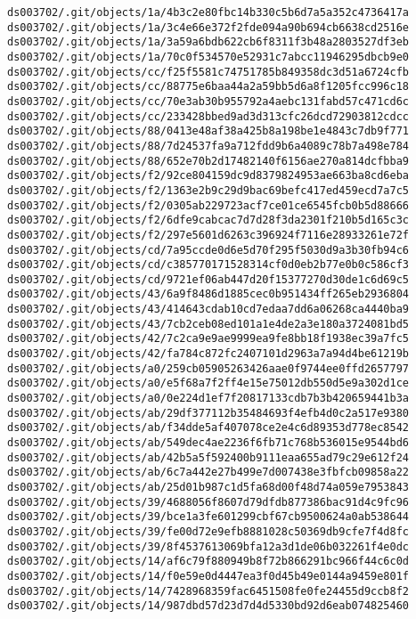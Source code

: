 \documentclass[11pt]{article}
\begin{document}
\begin{Verbatim}[commandchars=\\\{\}]
ds003702/.git/objects/1a/4b3c2e80fbc14b330c5b6d7a5a352c4736417a
ds003702/.git/objects/1a/3c4e66e372f2fde094a90b694cb6638cd2516e
ds003702/.git/objects/1a/3a59a6bdb622cb6f8311f3b48a2803527df3eb
ds003702/.git/objects/1a/70c0f534570e52931c7abcc11946295dbcb9e0
ds003702/.git/objects/cc/f25f5581c74751785b849358dc3d51a6724cfb
ds003702/.git/objects/cc/88775e6baa44a2a59bb5d6a8f1205fcc996c18
ds003702/.git/objects/cc/70e3ab30b955792a4aebc131fabd57c471cd6c
ds003702/.git/objects/cc/233428bbed9ad3d313cfc26dcd72903812cdcc
ds003702/.git/objects/88/0413e48af38a425b8a198be1e4843c7db9f771
ds003702/.git/objects/88/7d24537fa9a712fdd9b6a4089c78b7a498e784
ds003702/.git/objects/88/652e70b2d17482140f6156ae270a814dcfbba9
ds003702/.git/objects/f2/92ce804159dc9d8379824953ae663ba8cd6eba
ds003702/.git/objects/f2/1363e2b9c29d9bac69befc417ed459ecd7a7c5
ds003702/.git/objects/f2/0305ab229723acf7ce01ce6545fcb0b5d88666
ds003702/.git/objects/f2/6dfe9cabcac7d7d28f3da2301f210b5d165c3c
ds003702/.git/objects/f2/297e5601d6263c396924f7116e28933261e72f
ds003702/.git/objects/cd/7a95ccde0d6e5d70f295f5030d9a3b30fb94c6
ds003702/.git/objects/cd/c385770171528314cf0d0eb2b77e0b0c586cf3
ds003702/.git/objects/cd/9721ef06ab447d20f15377270d30de1c6d69c5
ds003702/.git/objects/43/6a9f8486d1885cec0b951434ff265eb2936804
ds003702/.git/objects/43/414643cdab10cd7edaa7dd6a06268ca4440ba9
ds003702/.git/objects/43/7cb2ceb08ed101a1e4de2a3e180a3724081bd5
ds003702/.git/objects/42/7c2ca9e9ae9999ea9fe8bb18f1938ec39a7fc5
ds003702/.git/objects/42/fa784c872fc2407101d2963a7a94d4be61219b
ds003702/.git/objects/a0/259cb05905263426aae0f9744ee0ffd2657797
ds003702/.git/objects/a0/e5f68a7f2ff4e15e75012db550d5e9a302d1ce
ds003702/.git/objects/a0/0e224d1ef7f20817133cdb7b3b420659441b3a
ds003702/.git/objects/ab/29df377112b35484693f4efb4d0c2a517e9380
ds003702/.git/objects/ab/f34dde5af407078ce2e4c6d89353d778ec8542
ds003702/.git/objects/ab/549dec4ae2236f6fb71c768b536015e9544bd6
ds003702/.git/objects/ab/42b5a5f592400b9111eaa655ad79c29e612f24
ds003702/.git/objects/ab/6c7a442e27b499e7d007438e3fbfcb09858a22
ds003702/.git/objects/ab/25d01b987c1d5fa68d00f48d74a059e7953843
ds003702/.git/objects/39/4688056f8607d79dfdb877386bac91d4c9fc96
ds003702/.git/objects/39/bce1a3fe601299cbf67cb9500624a0ab538644
ds003702/.git/objects/39/fe00d72e9efb8881028c50369db9cfe7f4d8fc
ds003702/.git/objects/39/8f4537613069bfa12a3d1de06b032261f4e0dc
ds003702/.git/objects/14/af6c79f880949b8f72b866291bc966f44c6c0d
ds003702/.git/objects/14/f0e59e0d4447ea3f0d45b49e0144a9459e801f
ds003702/.git/objects/14/7428968359fac6451508fe0fe24455d9ccb8f2
ds003702/.git/objects/14/987dbd57d23d7d4d5330bd92d6eab074825460

\end{Verbatim}
\end{document}
